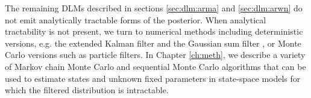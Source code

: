 The remaining DLMs described in sections \ref{sec:dlm:arma} and \ref{sec:dlm:arwn} do not emit analytically tractable forms of the posterior. When analytical tractability is not present, we turn to numerical methods including deterministic versions, e.g. the extended Kalman filter \cite[Section 1.6][]{hay:2001:kal} and the Gaussian sum filter \citep{Alsp:Sore:nonl:1972}, or Monte Carlo versions such as particle filters. In Chapter \ref{ch:meth}, we describe a variety of Markov chain Monte Carlo and sequential Monte Carlo algorithms that can be used to estimate states and unknown fixed parameters in state-space models for which the filtered distribution is intractable. 